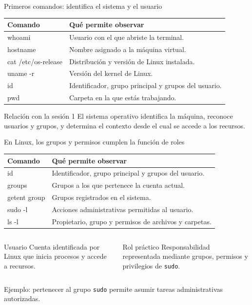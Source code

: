 \documentclass[aspectratio=169,10pt,c]{beamer}
\begin{document}
\begin{frame}{Primeros comandos: identifica el sistema y el usuario}
\small
\begin{tabular}{>{\ttfamily}p{4.1cm}p{7.65cm}}
\toprule
\normalfont\bfseries Comando & \textbf{Qué permite observar}\\
\midrule
whoami & Usuario con el que abriste la terminal.\\
hostname & Nombre asignado a la máquina virtual.\\
cat /etc/os-release & Distribución y versión de Linux instalada.\\
uname -r & Versión del kernel de Linux.\\
id & Identificador, grupo principal y grupos del usuario.\\
pwd & Carpeta en la que estás trabajando.\\
\bottomrule
\end{tabular}
\vspace{0.35cm}
\begin{exampleblock}{Relación con la sesión 1}
\small El sistema operativo identifica la máquina, reconoce usuarios y grupos, y determina el contexto desde el cual se accede a los recursos.
\end{exampleblock}
\end{frame}

\begin{frame}{En Linux, los grupos y permisos cumplen la función de roles}
\small
\begin{tabular}{>{\ttfamily}p{4.1cm}p{7.65cm}}
\toprule
\normalfont\bfseries Comando & \textbf{Qué permite observar}\\
\midrule
id & Identificador, grupo principal y grupos del usuario.\\
groups & Grupos a los que pertenece la cuenta actual.\\
getent group & Grupos registrados en el sistema.\\
sudo -l & Acciones administrativas permitidas al usuario.\\
ls -l & Propietario, grupo y permisos de archivos y carpetas.\\
\bottomrule
\end{tabular}
\vspace{0.3cm}
\begin{columns}[T,onlytextwidth]
\begin{block}{Usuario}
\small Cuenta identificada por Linux que inicia procesos y accede a recursos.
\end{block}
\begin{exampleblock}{Rol práctico}
\small Responsabilidad representada mediante grupos, permisos y privilegios de \texttt{sudo}.
\end{exampleblock}
\end{columns}
\vspace{0.1cm}
\centering\small Ejemplo: pertenecer al grupo \texttt{sudo} permite asumir tareas administrativas autorizadas.
\end{frame}
\end{document}
